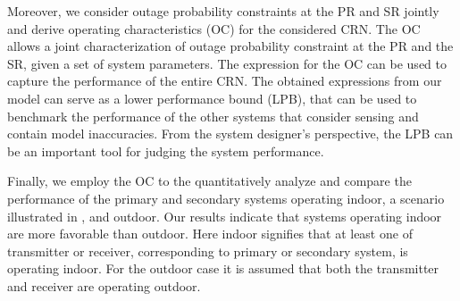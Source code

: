 \documentclass[conference, twocolumn]{IEEEtran}
\newtheorem{defi}{Definition}
\begin{document}
Moreover, we consider outage probability constraints at the PR and SR jointly and derive operating characteristics (OC) for the considered CRN. 
The OC allows a joint characterization of outage probability constraint at the PR and the SR, given a set of system parameters. The expression for the OC can be used to capture the performance of the entire CRN. 
The obtained expressions from our model can serve as a lower performance bound (LPB), that can be used to benchmark the performance of the other systems that consider sensing and contain model inaccuracies. From the system designer's perspective, the LPB can be an important tool for judging the system performance. 

Finally, we employ the OC to the quantitatively analyze and compare the performance of the primary and secondary systems operating indoor, a scenario illustrated in \cite{Kaushik13}, and outdoor. Our results indicate that systems operating indoor are more favorable than outdoor. Here indoor signifies that at least one of transmitter or receiver, corresponding to primary or secondary system, is operating indoor. For the outdoor case it is assumed that both the transmitter and receiver are operating outdoor. 
\end{document}
